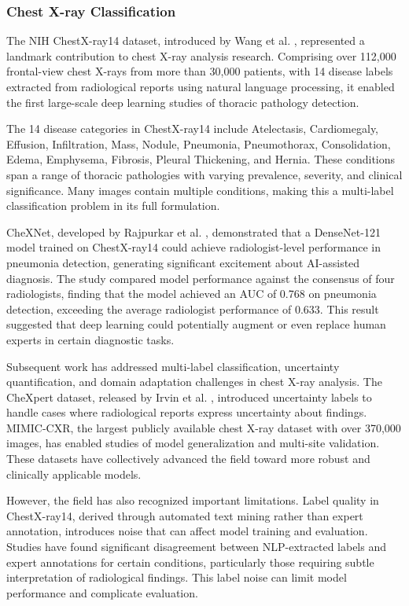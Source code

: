 \documentclass[12pt,a4paper]{article}
\begin{document}
\subsubsection{Chest X-ray Classification}

The NIH ChestX-ray14 dataset, introduced by Wang et al. \cite{wang2017}, represented a landmark contribution to chest X-ray analysis research. Comprising over 112,000 frontal-view chest X-rays from more than 30,000 patients, with 14 disease labels extracted from radiological reports using natural language processing, it enabled the first large-scale deep learning studies of thoracic pathology detection.

The 14 disease categories in ChestX-ray14 include Atelectasis, Cardiomegaly, Effusion, Infiltration, Mass, Nodule, Pneumonia, Pneumothorax, Consolidation, Edema, Emphysema, Fibrosis, Pleural Thickening, and Hernia. These conditions span a range of thoracic pathologies with varying prevalence, severity, and clinical significance. Many images contain multiple conditions, making this a multi-label classification problem in its full formulation.

CheXNet, developed by Rajpurkar et al. \cite{rajpurkar2017}, demonstrated that a DenseNet-121 model trained on ChestX-ray14 could achieve radiologist-level performance in pneumonia detection, generating significant excitement about AI-assisted diagnosis. The study compared model performance against the consensus of four radiologists, finding that the model achieved an AUC of 0.768 on pneumonia detection, exceeding the average radiologist performance of 0.633. This result suggested that deep learning could potentially augment or even replace human experts in certain diagnostic tasks.

Subsequent work has addressed multi-label classification, uncertainty quantification, and domain adaptation challenges in chest X-ray analysis. The CheXpert dataset, released by Irvin et al. \cite{irvin2019}, introduced uncertainty labels to handle cases where radiological reports express uncertainty about findings. MIMIC-CXR, the largest publicly available chest X-ray dataset with over 370,000 images, has enabled studies of model generalization and multi-site validation. These datasets have collectively advanced the field toward more robust and clinically applicable models.

However, the field has also recognized important limitations. Label quality in ChestX-ray14, derived through automated text mining rather than expert annotation, introduces noise that can affect model training and evaluation. Studies have found significant disagreement between NLP-extracted labels and expert annotations for certain conditions, particularly those requiring subtle interpretation of radiological findings. This label noise can limit model performance and complicate evaluation.
\end{document}
